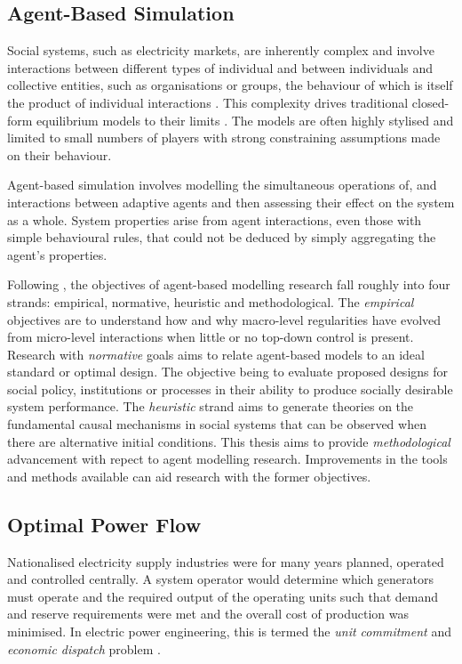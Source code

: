 \subsection{Agent-Based Simulation}
Social systems, such as electricity markets, are inherently complex and involve
interactions between different types of individual and between individuals and
collective entities, such as organisations or groups, the behaviour of which is
itself the product of individual interactions \cite{rossiter:2010}.  This
complexity drives traditional closed-form equilibrium models to their limits
\cite{ehrenmann:2009}. The models are often highly stylised and limited to small
numbers of players with strong constraining assumptions made on their behaviour.

Agent-based simulation involves modelling the simultaneous operations of, and
interactions between adaptive agents and then assessing their effect on the
system as a whole.  System properties arise from agent interactions, even those
with simple behavioural rules, that could not be deduced by simply aggregating
the agent's properties. %

Following , the objectives of agent-based modelling
research fall roughly into four strands: empirical, normative, heuristic and
methodological. The \textit{empirical} objectives are to understand how and why
macro-level regularities have evolved from micro-level interactions when little
or no top-down control is present.  Research with \textit{normative} goals aims
to relate agent-based models to an ideal standard or optimal design.  The
objective being to evaluate proposed designs for social policy, institutions or
processes in their ability to produce socially desirable system performance. The
\textit{heuristic} strand aims to generate theories on the fundamental causal
mechanisms in social systems that can be observed when there are alternative
initial conditions.  This thesis aims to provide \textit{methodological}
advancement with repect to agent modelling research.  Improvements in the tools
and methods available can aid research with the former objectives.

\subsection{Optimal Power Flow}
\label{sec:opf}
Nationalised electricity supply industries were for many years planned, operated
and controlled centrally.  A system operator would determine which generators
must operate and the required output of the operating units such that demand and
reserve requirements were met and the overall cost of production was minimised.
In electric power engineering, this is termed the \textit{unit commitment} and
\textit{economic dispatch} problem \cite{wood:pgoc}.

